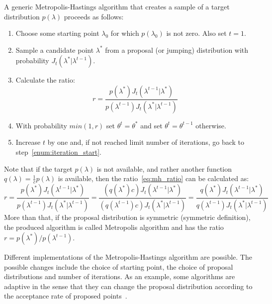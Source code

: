 A generic Metropolis-Hastings algorithm that creates a sample of a 
target distribution $p (\lambda)$ proceeds as follows:
\begin{enumerate}
\item{Choose some starting point $\lambda_0$ for which $p (\lambda_0)$ 
    is not zero. Also set $t = 1$.}
\item{Sample a candidate point $\lambda^*$ from a proposal (or jumping) 
    distribution with probability $J_t (\lambda^* | \lambda^{t - 1})$.}
    \label{enum:iteration_start}
\item{Calculate the ratio:}
    \begin{equation}
        r = \frac{p (\lambda^*) J_t (\lambda^{t - 1} | \lambda^*)}
                 {p (\lambda^{t - 1}) J_t (\lambda^* | \lambda^{t - 1})}
        \label{eq:mh_ratio}
    \end{equation}
\item{With probability $min (1, r)$ set $\theta^t = \theta^*$ and set
    $\theta^t = \theta^{t - 1}$ otherwise.}
\item{Increase $t$ by one and, if not reached limit number of 
    iterations, go back to step~\ref{enum:iteration_start}.}
\end{enumerate}
Note that if the target $p (\lambda)$ is not available, and rather 
another function $q (\lambda) = \frac{1}{c}p(\lambda)$ is available, 
then the ratio~\ref{eq:mh_ratio} can be calculated as:
\begin{equation*}
    r = \frac{p (\lambda^*) J_t (\lambda^{t - 1} | \lambda^*)}
              {p (\lambda^{t - 1}) J_t (\lambda^* | \lambda^{t - 1})} 
      = \frac{(q (\lambda^*)c) J_t (\lambda^{t - 1} | \lambda^*)}
           {(q (\lambda^{t - 1})c) J_t (\lambda^* | \lambda^{t - 1})} 
      = \frac{q (\lambda^*) J_t (\lambda^{t - 1} | \lambda^*)}
              {q (\lambda^{t - 1}) J_t (\lambda^* | \lambda^{t - 1})}
\end{equation*}
More than that, if the proposal distribution is symmetric (symmetric definition), the produced 
algorithm is called Metropolis algorithm and has the ratio 
$r = {p (\lambda^*)}/{p (\lambda^{t - 1})}$. 

Different implementations of the Metropolis-Hastings algorithm are 
possible. The possible changes include the choice of starting point,
the choice of proposal distributions and number of iterations. As an
example, some algorithms are adaptive in the sense that they can change 
the proposal distribution according to the acceptance rate of proposed 
points~\cite{Gelman2013}.
